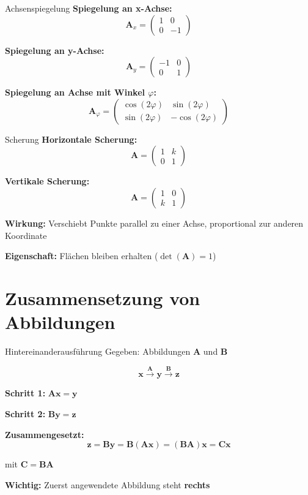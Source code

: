 \documentclass[a4paper, fontsize=7pt]{scrartcl}
\begin{document}
\begin{mainbox}{Achsenspiegelung}
\textbf{Spiegelung an x-Achse:}
$$\mathbf{A}_x = \begin{pmatrix} 1 & 0 \\ 0 & -1 \end{pmatrix}$$

\textbf{Spiegelung an y-Achse:}
$$\mathbf{A}_y = \begin{pmatrix} -1 & 0 \\ 0 & 1 \end{pmatrix}$$

\textbf{Spiegelung an Achse mit Winkel $\varphi$:}
$$\mathbf{A}_\varphi = \begin{pmatrix} \cos(2\varphi) & \sin(2\varphi) \\ \sin(2\varphi) & -\cos(2\varphi) \end{pmatrix}$$
\end{mainbox}

\begin{mainbox}{Scherung}
\textbf{Horizontale Scherung:}
$$\mathbf{A} = \begin{pmatrix} 1 & k \\ 0 & 1 \end{pmatrix}$$

\textbf{Vertikale Scherung:}
$$\mathbf{A} = \begin{pmatrix} 1 & 0 \\ k & 1 \end{pmatrix}$$

\textbf{Wirkung:} Verschiebt Punkte parallel zu einer Achse, proportional zur anderen Koordinate

\textbf{Eigenschaft:} Flächen bleiben erhalten ($\det(\mathbf{A}) = 1$)
\end{mainbox}

\section{Zusammensetzung von Abbildungen}

\begin{mainbox}{Hintereinanderausführung}
Gegeben: Abbildungen $\mathbf{A}$ und $\mathbf{B}$

$$\mathbf{x} \xrightarrow{\mathbf{A}} \mathbf{y} \xrightarrow{\mathbf{B}} \mathbf{z}$$

\textbf{Schritt 1:} $\mathbf{Ax} = \mathbf{y}$

\textbf{Schritt 2:} $\mathbf{By} = \mathbf{z}$

\textbf{Zusammengesetzt:}
$$\mathbf{z} = \mathbf{By} = \mathbf{B}(\mathbf{Ax}) = (\mathbf{BA})\mathbf{x} = \mathbf{Cx}$$

mit $\mathbf{C} = \mathbf{BA}$

\textbf{Wichtig:} Zuerst angewendete Abbildung steht \textbf{rechts}
\end{mainbox}
\end{document}
